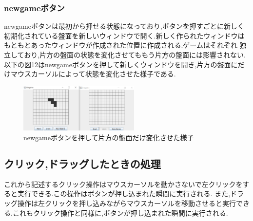 \documentclass[dvipdfmx]{jarticle}
\begin{document}
\subsubsection{newgameボタン}
newgameボタンは最初から押せる状態になっており,ボタンを押すごとに新しく初期化されている盤面を新しいウィンドウで開く.新しく作られたウィンドウはもともとあったウィンドウが作成された位置に作成される.ゲームはそれぞれ
独立しており,片方の盤面の状態を変化させてももう片方の盤面には影響されない.
以下の図12はnewgameボタンを押して新しくウィンドウを開き,片方の盤面にだけマウスカーソルによって状態を変化させた様子である.
\begin{figure}[h]
  \centering
  \includegraphics[width=6cm]{newgame.png}
  \caption{newgameボタンを押して片方の盤面だけ変化させた様子}
\end{figure}
\subsection{クリック,ドラッグしたときの処理}
これから記述するクリック操作はマウスカーソルを動かさないで左クリックをすると実行できる.この操作はボタンが押し込まれた瞬間に実行される.
また,ドラッグ操作は左クリックを押し込みながらマウスカーソルを移動させると実行できる.これもクリック操作と同様に,ボタンが押し込まれた瞬間に実行される.
\end{document}

